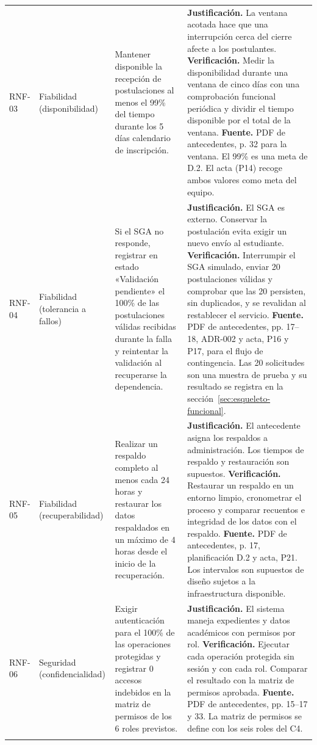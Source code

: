 \begin{longtable}{@{}>{\raggedright\arraybackslash}p{.13\linewidth}>{\raggedright\arraybackslash}p{.17\linewidth}>{\raggedright\arraybackslash}p{.25\linewidth}>{\raggedright\arraybackslash}p{.32\linewidth}@{}}
RNF-03 & Fiabilidad (disponibilidad) & Mantener disponible la recepción de postulaciones al menos el 99\% del tiempo durante los 5 días calendario de inscripción. & \textbf{Justificación.} La ventana acotada hace que una interrupción cerca del cierre afecte a los postulantes. \textbf{Verificación.} Medir la disponibilidad durante una ventana de cinco días con una comprobación funcional periódica y dividir el tiempo disponible por el total de la ventana. \textbf{Fuente.} PDF de antecedentes, p. 32 para la ventana. El 99\% es una meta de D.2. El acta (P14) recoge ambos valores como meta del equipo. \\ \addlinespace
RNF-04 & Fiabilidad (tolerancia a fallos) & Si el SGA no responde, registrar en estado «Validación pendiente» el 100\% de las postulaciones válidas recibidas durante la falla y reintentar la validación al recuperarse la dependencia. & \textbf{Justificación.} El SGA es externo. Conservar la postulación evita exigir un nuevo envío al estudiante. \textbf{Verificación.} Interrumpir el SGA simulado, enviar 20 postulaciones válidas y comprobar que las 20 persisten, sin duplicados, y se revalidan al restablecer el servicio. \textbf{Fuente.} PDF de antecedentes, pp. 17--18, ADR-002 y acta, P16 y P17, para el flujo de contingencia. Las 20 solicitudes son una muestra de prueba y su resultado se registra en la sección~\ref{sec:esqueleto-funcional}. \\ \addlinespace
RNF-05 & Fiabilidad (recuperabilidad) & Realizar un respaldo completo al menos cada 24 horas y restaurar los datos respaldados en un máximo de 4 horas desde el inicio de la recuperación. & \textbf{Justificación.} El antecedente asigna los respaldos a administración. Los tiempos de respaldo y restauración son supuestos. \textbf{Verificación.} Restaurar un respaldo en un entorno limpio, cronometrar el proceso y comparar recuentos e integridad de los datos con el respaldo. \textbf{Fuente.} PDF de antecedentes, p. 17, planificación D.2 y acta, P21. Los intervalos son supuestos de diseño sujetos a la infraestructura disponible. \\ \addlinespace
RNF-06 & Seguridad (confidencialidad) & Exigir autenticación para el 100\% de las operaciones protegidas y registrar 0 accesos indebidos en la matriz de permisos de los 6 roles previstos. & \textbf{Justificación.} El sistema maneja expedientes y datos académicos con permisos por rol. \textbf{Verificación.} Ejecutar cada operación protegida sin sesión y con cada rol. Comparar el resultado con la matriz de permisos aprobada. \textbf{Fuente.} PDF de antecedentes, pp. 15--17 y 33. La matriz de permisos se define con los seis roles del C4. \\ \addlinespace

\end{longtable}

